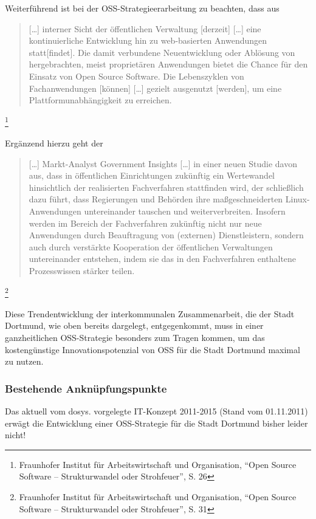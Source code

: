 \documentclass[a4paper]{scrartcl}
\begin{document}
Weiterführend ist bei der OSS-Strategieerarbeitung zu beachten, dass
aus \begin{quote} [\ldots] interner Sicht der öffentlichen Verwaltung [derzeit]
  [\ldots] eine kontinuierliche Entwicklung hin zu web-basierten Anwendungen
  statt[findet]. Die damit verbundene Neuentwicklung oder Ablösung von
  hergebrachten, meist proprietären Anwendungen bietet die Chance für den
  Einsatz von Open Source Software. Die Lebenszyklen von Fachanwendungen
  [können] [\ldots] gezielt ausgenutzt [werden], um eine Plattformunabhängigkeit
  zu erreichen.\end{quote}\footnote{Fraunhofer Institut für Arbeitswirtschaft
  und Organisation, ``Open Source Software -- Strukturwandel oder Strohfeuer'',
  S. 26}

Ergänzend hierzu geht der \begin{quote} [\ldots] Markt-Analyst Government
  Insights [\ldots] in einer neuen Studie davon aus, dass in öffentlichen
  Einrichtungen zukünftig ein Wertewandel hinsichtlich der realisierten
  Fachverfahren stattfinden wird, der schließlich dazu führt, dass Regierungen
  und Behörden ihre maßgeschneiderten Linux-Anwendungen untereinander tauschen
  und weiterverbreiten. Insofern werden im Bereich der Fachverfahren zukünftig
  nicht nur neue Anwendungen durch Beauftragung von (externen) Dienstleistern,
  sondern auch durch verstärkte Kooperation der öffentlichen Verwaltungen
  untereinander entstehen, indem sie das in den Fachverfahren enthaltene
  Prozesswissen stärker teilen.\end{quote}\footnote{Fraunhofer Institut für
  Arbeitswirtschaft und Organisation, ``Open Source Software -- Strukturwandel
  oder Strohfeuer'', S. 31}

Diese Trendentwicklung der interkommunalen Zusammenarbeit, die der Stadt
Dortmund, wie oben bereits dargelegt, entgegenkommt, muss in einer
ganzheitlichen OSS-Strategie besonders zum Tragen kommen, um das kostengünstige
Innovationspotenzial von OSS für die Stadt Dortmund maximal zu nutzen.

\subsubsection{Bestehende Anknüpfungspunkte}

Das aktuell vom dosys. vorgelegte IT-Konzept 2011-2015 (Stand vom 01.11.2011)
erwägt die Entwicklung einer OSS-Strategie für die Stadt Dortmund bisher leider
nicht!
\end{document}
